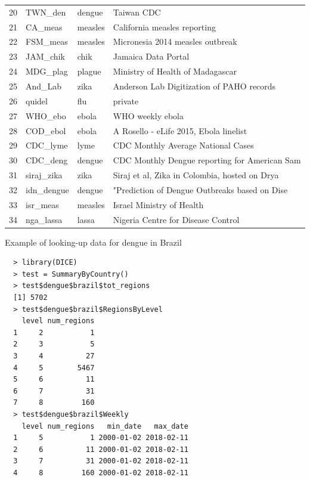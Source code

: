 \documentclass[a4paper]{article}
\begin{document}
\begin{table}[ht]
\begin{tabular}{|r|l|l|l|}
   20 & TWN\_den & dengue & Taiwan CDC \\ 
   21 & CA\_meas & measles & California measles reporting \\ 
   22 & FSM\_meas & measles & Micronesia 2014 measles outbreak \\ 
   23 & JAM\_chik & chik & Jamaica Data Portal \\ 
   24 & MDG\_plag & plague & Ministry of Health of Madagascar \\ 
   25 & And\_Lab & zika & Anderson Lab Digitization of PAHO records \\ 
   26 & quidel & flu & private \\ 
   27 & WHO\_ebo & ebola & WHO weekly ebola \\ 
   28 & COD\_ebol & ebola & A Rosello - eLife 2015, Ebola linelist \\ 
   29 & CDC\_lyme & lyme & CDC Monthly Average National Cases \\ 
   30 & CDC\_deng & dengue & CDC Monthly Dengue reporting for American Sam \\ 
   31 & siraj\_zika & zika & Siraj et al, Zika in Colombia, hosted on Drya \\ 
   32 & idn\_dengue & dengue & "Prediction of Dengue Outbreaks based on Dise \\ 
   33 & isr\_meas & measles & Israel Ministry of Health \\ 
   34 & nga\_lassa & lassa & Nigeria Centre for Disease Control \\ 
   \hline
\end{tabular}
\end{table}
\clearpage %

Example of looking-up data for dengue in Brazil
\begin{verbatim}
  > library(DICE)
  > test = SummaryByCountry()
  > test$dengue$brazil$tot_regions
  [1] 5702
  > test$dengue$brazil$RegionsByLevel
    level num_regions
  1     2           1
  2     3           5
  3     4          27
  4     5        5467
  5     6          11
  6     7          31
  7     8         160
  > test$dengue$brazil$Weekly
    level num_regions   min_date   max_date
  1     5           1 2000-01-02 2018-02-11
  2     6          11 2000-01-02 2018-02-11
  3     7          31 2000-01-02 2018-02-11
  4     8         160 2000-01-02 2018-02-11
\end{verbatim}
\end{document}
